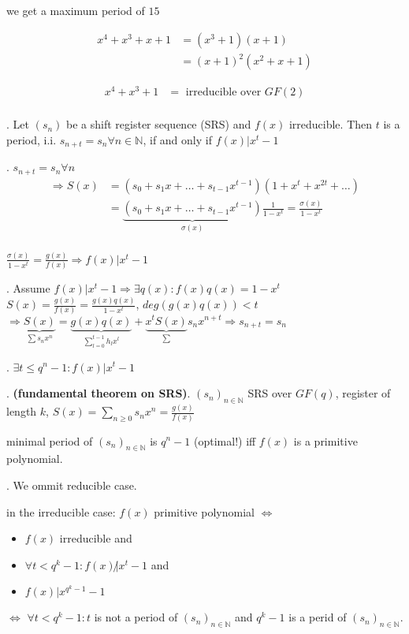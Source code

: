 we get a maximum period of $15$

\begin{align*}
  x^4 + x^3 + x + 1 &= (x^3 + 1)(x+1)\\
    &= (x+1)^2(x^2+x+1)
\end{align*}

\begin{align*}
  x^4 + x^3 + 1 &= \text{ irreducible over $GF(2)$}\\
\end{align*}

\Theorem.
Let $(s_n)$ be a shift register sequence (SRS) and $f(x)$ irreducible. Then $t$ is a period, i.i. $s_{n+t}= s_n \forall n \in \mathbb{N}$, if and only if $f(x) | x^t-1$

\ProofForward.
$s_{n+t}= s_n \forall n$\\
\begin{align*}
  \Rightarrow S(x) &= (s_0+s_1x+ \ldots + s_{t-1}x^{t-1})(1+x^t+x^{2t}+\ldots)\\
                   &= \underbrace{(s_0+s_1x+ \ldots + s_{t-1}x^{t-1})}_{\sigma(x)} \frac{1}{1-x^t} = \frac{\sigma(x)}{1-x^t}\\
\end{align*}

$\frac{\sigma(x)}{1-x^t} = \frac{g(x)}{f(x)} \Rightarrow f(x) | x^t-1$

\ProofBackward.
Assume $f(x) | x^t-1 \Rightarrow \exists q(x): f(x)q(x) = 1-x^t$\\
$S(x) = \frac{g(x)}{f(x)} = \frac{g(x)q(x)}{1-x^t}$, $deg(g(x)q(x))<t$\\
$\Rightarrow \underbrace{S(x)}_{\sum s_n x^n} = \underbrace{g(x)q(x)}_{\sum_{l=0}^{t-1}h_lx^l} + \underbrace{x^t S(x)}_\sum s_n x^{n+t} \Rightarrow s_{n+t}= s_n$

\Corollary.
$\exists t \leq q^n -1: f(x) | x^t-1$

\Theorem. 
\textbf{(fundamental theorem on SRS)}.
$(s_n)_{n\in \mathbb{N}}$ SRS over $GF(q)$, register of length $k$, $S(x) = \sum_{n \geq 0} s_n x^n = \frac{g(x)}{f(x)}$

minimal period of $(s_n)_{n\in \mathbb{N}}$ is $q^n -1$ (optimal!) iff $f(x)$ is a primitive polynomial.

\Proof.
We ommit reducible case. 

in the irreducible case: $f(x)$ primitive polynomial $\iff$ 
\begin{itemize}
  \item $f(x)$ irreducible and
  \item $\forall t < q^k -1 : f(x) \not| x^t-1$ and 
  \item $f(x) | x^{q^k-1}-1$
\end{itemize}

$\iff$ $\forall t < q^k -1: t$ is not a period of $(s_n)_{n\in \mathbb{N}}$ and $q^k-1$ is a perid of $(s_n)_{n\in \mathbb{N}}$.
